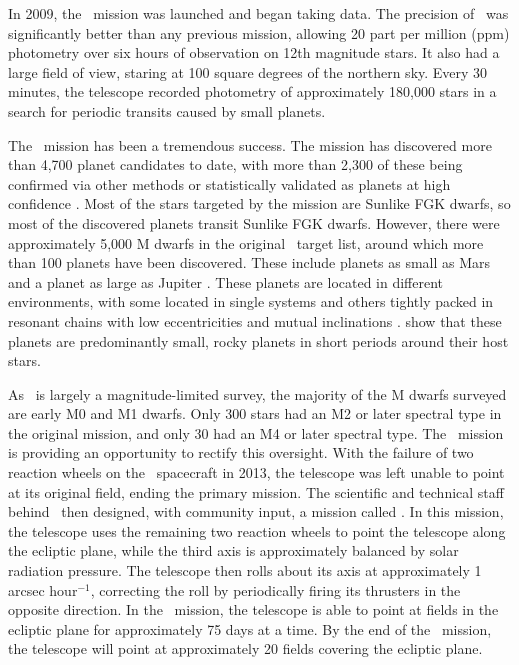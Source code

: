 In 2009, the \kep\ mission \citep{Borucki10} was launched and began taking data.
The precision of \kep\ was significantly better than any previous mission, allowing
20 part per million (ppm) photometry over six hours of observation on 12th magnitude
stars. 
It also had a large field of view, staring at 100 square degrees of the northern sky.
Every 30 minutes, the telescope recorded photometry of approximately 180,000 stars in a
search for periodic transits caused by small planets.

The \kep\ mission has been a tremendous success.
The mission has discovered more than 4,700 planet candidates to date, with more than 
2,300 of these being confirmed via other methods or statistically validated as planets
at high confidence \citep{Batalha13, Burke14, Mullally15, Rowe15, Morton16}.
Most of the stars targeted by the mission are Sunlike FGK dwarfs, so most of the discovered
planets transit Sunlike FGK dwarfs.
However, there were approximately 5,000 M dwarfs in the original \kep\ target list, around
which more than 100 planets have been discovered.
These include planets as small as Mars \citep{KOI961} and a planet as large as Jupiter
\citep{Johnson11c}.
These planets are located in different environments, with some located in single systems
and others tightly packed in resonant chains with low eccentricities and mutual inclinations
\citep{Swift13, Ballard16}.
\citet{Morton14} show that these planets are predominantly small, rocky planets in short
periods around their host stars.

As \kep\ is largely a magnitude-limited
survey, the majority of the M dwarfs surveyed are early M0 and M1 dwarfs. 
Only 300 stars had an M2 or later spectral type in the original mission, and only 30 had
an M4 or later spectral type.
The \KT\ mission is providing an opportunity to rectify this oversight.
With the failure of two reaction wheels on the \kep\ spacecraft in 2013, the telescope
was left unable to point at its original field, ending the primary mission.
The scientific and technical staff behind \kep\ then designed, with community input,
a mission called \KT. 
In this mission, the telescope uses the remaining two reaction wheels to point the telescope
along the ecliptic plane, while the third axis is approximately balanced by solar radiation
pressure.
The telescope then rolls about its axis at approximately 1 arcsec hour$^{-1}$, correcting the
roll by periodically firing its thrusters in the opposite direction.
In the \KT\ mission, the telescope is able to point at fields in the ecliptic plane for
approximately 75 days at a time.
By the end of the \KT\ mission, the telescope will point at approximately 20 fields
covering the ecliptic plane.

